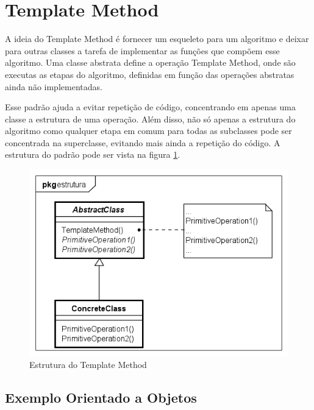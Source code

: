 \section{Template Method}

A ideia do Template Method é fornecer um esqueleto para um algoritmo 
e deixar para outras classes a tarefa de implementar as funções que 
compõem esse algoritmo. Uma classe abstrata define a operação Template 
Method, onde são executas as etapas do algoritmo, definidas em função 
das operações abstratas ainda não implementadas.

Esse padrão ajuda a evitar repetição de código, concentrando 
em apenas uma classe a estrutura de uma operação. Além disso, 
não só apenas a estrutura do algoritmo como qualquer etapa em 
comum para todas as subclasses pode ser concentrada na superclasse, 
evitando mais ainda a repetição do código. A estrutura do padrão 
pode ser vista na figura \ref{tpmethod_struct}.

\begin{figure}[htb]
	\caption{\label{tpmethod_struct}Estrutura do Template Method}
	\begin{center}
	    \includegraphics[scale=0.5]{5_padroes-contexto-funcional/5.3_comportamentais/5.3.10_template-method/templatemethod_estrutura.png}
	\end{center}
\end{figure}

\subsection*{Exemplo Orientado a Objetos}

